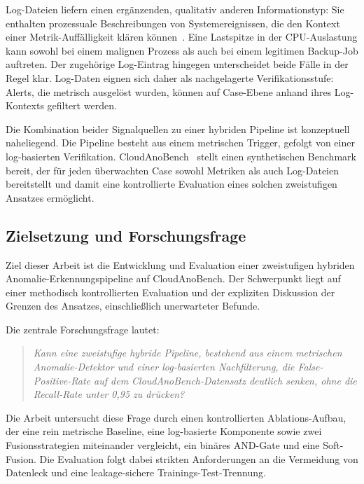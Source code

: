 Log-Dateien liefern einen ergänzenden, qualitativ anderen Informationstyp: Sie
enthalten prozessuale Beschreibungen von Systemereignissen, die den Kontext einer
Metrik-Auffälligkeit klären können~\cite{he2021survey}. Eine Lastspitze in der
CPU-Auslastung kann sowohl bei einem malignen Prozess als auch bei einem legitimen
Backup-Job auftreten. Der zugehörige Log-Eintrag hingegen unterscheidet beide
Fälle in der Regel klar. Log-Daten eignen sich daher als nachgelagerte
Verifikationsstufe: Alerts, die metrisch ausgelöst wurden, können auf Case-Ebene
anhand ihres Log-Kontexts gefiltert werden.

Die Kombination beider Signalquellen zu einer hybriden Pipeline ist konzeptuell
naheliegend. Die Pipeline besteht aus einem metrischen Trigger, gefolgt von einer
log-basierten Verifikation. CloudAnoBench~\cite{zou2025cloudanobench} stellt einen
synthetischen Benchmark bereit, der für jeden überwachten Case sowohl Metriken als
auch Log-Dateien bereitstellt und damit eine kontrollierte Evaluation eines solchen
zweistufigen Ansatzes ermöglicht.

\subsection{Zielsetzung und Forschungsfrage}

Ziel dieser Arbeit ist die Entwicklung und Evaluation einer zweistufigen hybriden
Anomalie-Erkennungspipeline auf CloudAnoBench. Der Schwerpunkt liegt auf einer
methodisch kontrollierten Evaluation und der expliziten Diskussion der Grenzen des
Ansatzes, einschließlich unerwarteter Befunde.

Die zentrale Forschungsfrage lautet:

\begin{quote}
  \emph{Kann eine zweistufige hybride Pipeline, bestehend aus einem metrischen
  Anomalie-Detektor und einer log-basierten Nachfilterung, die
  False-Positive-Rate auf dem CloudAnoBench-Datensatz deutlich senken, ohne die
  Recall-Rate unter 0{,}95 zu drücken?}
\end{quote}

Die Arbeit untersucht diese Frage durch einen kontrollierten Ablations-Aufbau, der
\mbox{eine} rein metrische Baseline, eine log-basierte Komponente sowie zwei
Fusions\-strategien miteinander vergleicht, ein binäres AND-Gate und eine Soft-Fusion. Die \mbox{Evaluation} folgt dabei strikten Anforderungen an die Vermeidung
von Datenleck und eine leakage-sichere Trainings-Test-Trennung.

